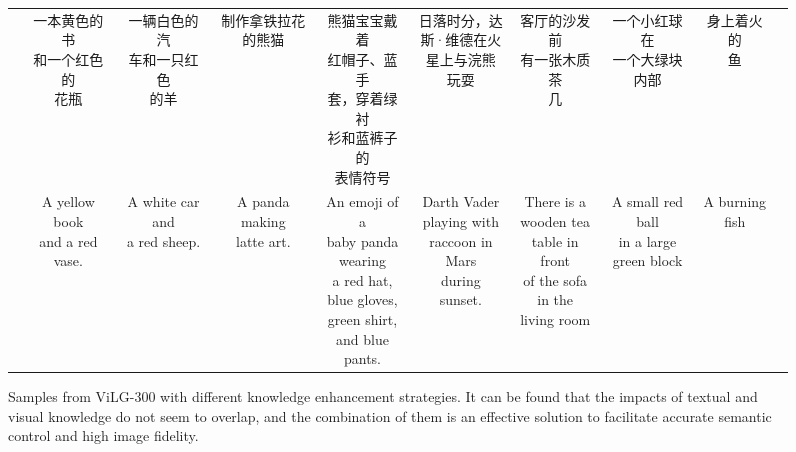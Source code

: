 \documentclass[10pt,twocolumn,letterpaper]{article}
\begin{document}
\begin{CJK*}{UTF8}{gbsn}
\begin{figure*}[t]
\begin{tabular}{cccccccccc}
        & \scriptsize \makecell{一本黄色的书 \\ 和一个红色的 \\ 花瓶}
        & \scriptsize \makecell{一辆白色的汽 \\ 车和一只红色 \\ 的羊}
        & \scriptsize \makecell{制作拿铁拉花 \\ 的熊猫}
        & \scriptsize \makecell{熊猫宝宝戴着 \\ 红帽子、蓝手 \\ 套，穿着绿衬 \\ 衫和蓝裤子的 \\ 表情符号}
        & \scriptsize \makecell{日落时分，达 \\ 斯·维德在火 \\ 星上与浣熊 \\ 玩耍 }
        & \scriptsize \makecell{客厅的沙发前 \\ 有一张木质茶 \\ 几}
        & \scriptsize \makecell{一个小红球在 \\ 一个大绿块 \\ 内部}
        & \scriptsize \makecell{身上着火的 \\ 鱼} \\ 
        & \scriptsize \makecell{A yellow book \\ and a red vase.}
        & \scriptsize \makecell{A white car and \\ a red sheep.}
        & \scriptsize \makecell{A panda making \\ latte art.}
        & \scriptsize \makecell{An emoji of a \\ baby panda \\ wearing \\ a red hat, \\ blue gloves, \\  green shirt, \\ and blue pants.}
        & \scriptsize \makecell{Darth Vader \\ playing with \\ raccoon in Mars \\ during sunset.}
        & \scriptsize \makecell{There is a \\ wooden tea \\ table in front \\ of the sofa \\ in the \\ living room}
        & \scriptsize \makecell{A small red ball \\ in a large \\ green block}
        & \scriptsize \makecell{A burning \\ fish}
    \end{tabular}
    \caption{Samples from ViLG-300 with different knowledge enhancement strategies. It can be found that the impacts of textual and visual knowledge do not seem to overlap, and the combination of them is an effective solution to facilitate accurate semantic control and high image fidelity.}
    \label{fig:ke_case}
\end{figure*}
\end{CJK*}
\end{document}
